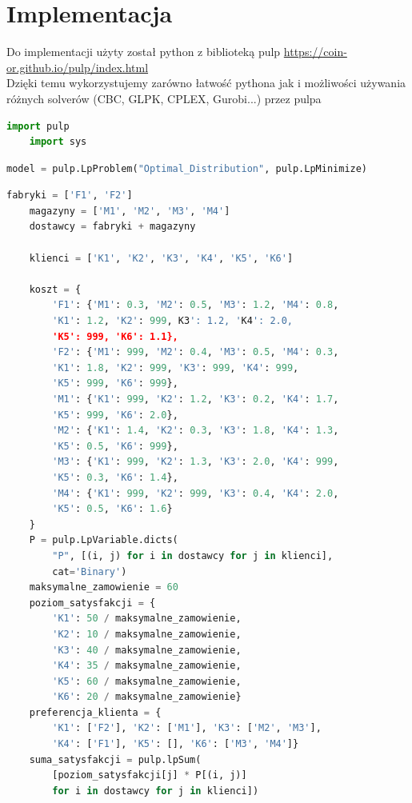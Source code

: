 \section{Implementacja}
Do implementacji użyty został python z biblioteką pulp \href{https://coin-or.github.io/pulp/index.html}{https://coin-or.github.io/pulp/index.html} \\ 
Dzięki temu wykorzystujemy zarówno łatwość pythona jak i możliwości używania różnych solverów (CBC, GLPK, CPLEX, Gurobi...) przez pulpa \\ 
\begin{lstlisting}[language=Python, caption={Import bilbioteki pulp i bibliotek używanych do wykresu}]
    import pulp
    import sys
\end{lstlisting}
\begin{lstlisting}[language=Python, caption={Iniicjalizacja modelu}]
    model = pulp.LpProblem("Optimal_Distribution", pulp.LpMinimize)
\end{lstlisting}

\begin{lstlisting}[language=Python, caption={Zdefiniowanie zmiennych i parametrów}]
    fabryki = ['F1', 'F2']
    magazyny = ['M1', 'M2', 'M3', 'M4']
    dostawcy = fabryki + magazyny 
    
    klienci = ['K1', 'K2', 'K3', 'K4', 'K5', 'K6']
    
    koszt = {
        'F1': {'M1': 0.3, 'M2': 0.5, 'M3': 1.2, 'M4': 0.8,
        'K1': 1.2, 'K2': 999, K3': 1.2, 'K4': 2.0,
        'K5': 999, 'K6': 1.1},
        'F2': {'M1': 999, 'M2': 0.4, 'M3': 0.5, 'M4': 0.3,
        'K1': 1.8, 'K2': 999, 'K3': 999, 'K4': 999,
        'K5': 999, 'K6': 999},
        'M1': {'K1': 999, 'K2': 1.2, 'K3': 0.2, 'K4': 1.7,
        'K5': 999, 'K6': 2.0},
        'M2': {'K1': 1.4, 'K2': 0.3, 'K3': 1.8, 'K4': 1.3,
        'K5': 0.5, 'K6': 999},
        'M3': {'K1': 999, 'K2': 1.3, 'K3': 2.0, 'K4': 999,
        'K5': 0.3, 'K6': 1.4},
        'M4': {'K1': 999, 'K2': 999, 'K3': 0.4, 'K4': 2.0,
        'K5': 0.5, 'K6': 1.6}
    }
    P = pulp.LpVariable.dicts(
        "P", [(i, j) for i in dostawcy for j in klienci],
        cat='Binary')
    maksymalne_zamowienie = 60
    poziom_satysfakcji = {
        'K1': 50 / maksymalne_zamowienie,
        'K2': 10 / maksymalne_zamowienie,
        'K3': 40 / maksymalne_zamowienie,
        'K4': 35 / maksymalne_zamowienie,
        'K5': 60 / maksymalne_zamowienie,
        'K6': 20 / maksymalne_zamowienie}
    preferencja_klienta = {
        'K1': ['F2'], 'K2': ['M1'], 'K3': ['M2', 'M3'],
        'K4': ['F1'], 'K5': [], 'K6': ['M3', 'M4']}
    suma_satysfakcji = pulp.lpSum(
        [poziom_satysfakcji[j] * P[(i, j)]
        for i in dostawcy for j in klienci])
\end{lstlisting}

